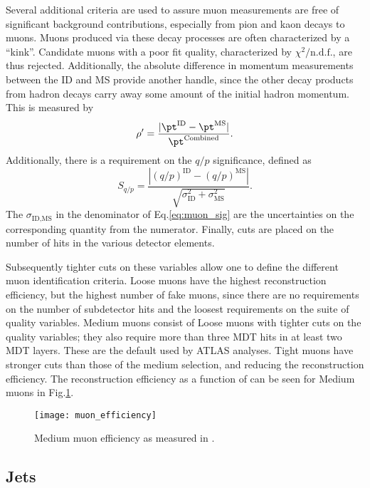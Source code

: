 Several additional criteria are used to assure muon measurements are free of significant background contributions, especially from pion and kaon decays to muons.
Muons produced via these decay processes are often characterized by a ``kink''.
Candidate muons with a poor fit quality, characterized by $\chi^2/\text{n.d.f.}$, are thus rejected.
Additionally, the absolute difference in momentum measurements between the ID and MS provide another handle, since the other decay products from hadron decays carry away some amount of the initial hadron momentum.
This is measured by
\begin{equation}
\rho' = \frac{|\pt^{\text{ID}} - \pt^{\text{MS}} |}{\pt^{\text{Combined}}}.
\end{equation}
Additionally, there is a requirement on the $q/p$ significance, defined as
\begin{equation}\label{eq:muon_sig}
S_{q/p} = \frac{|(q/p)^{\text{ID}} - (q/p)^{\text{MS}} |}{\sqrt{\sigma_{\text{ID}}^2 + \sigma_{\text{MS}}^2  }}.
\end{equation}
The $\sigma_{\text{ID,MS}}$ in the denominator of Eq.\ref{eq:muon_sig} are the uncertainties on the corresponding quantity from the numerator.
Finally, cuts are placed on the number of hits in the various detector elements.

Subsequently tighter cuts on these variables allow one to define the different muon identification criteria.
Loose muons have the highest reconstruction efficiency, but the highest number of fake muons, since there are no requirements on the number of subdetector hits and the loosest requirements on the suite of quality variables.
Medium muons consist of Loose muons with tighter cuts on the quality variables; they also require more than three MDT hits in at least two MDT layers.
These are the default used by ATLAS analyses.
Tight muons have stronger cuts than those of the medium selection, and reducing the reconstruction efficiency.
The reconstruction efficiency as a function of \pt can be seen for Medium muons in Fig.\ref{fig:muon_eff}.

\begin{figure}
\caption{Medium muon efficiency as measured in \cite{PERF-2015-10}.} \label{fig:muon_eff}
\texttt{[image: muon\_efficiency]}
\end{figure}

\subsection{Jets}

